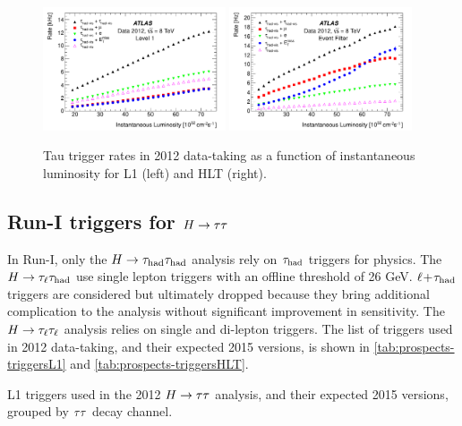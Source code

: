 \begin{figure}[tp]
  \centering
  \includegraphics[width=0.48\textwidth]{figures/PERF-2013-06/fig_01a}
  \includegraphics[width=0.48\textwidth]{figures/PERF-2013-06/fig_01b}
  \caption{Tau trigger rates in 2012 data-taking as a function of instantaneous luminosity for L1 (left) and HLT (right).}
  \label{fig:prospects-tautriggerrates}
\end{figure}

\subsection{Run-I triggers for $H\rightarrow\tau\tau$}

In Run-I, only the $H\rightarrow\tau_\text{had}\tau_\text{had}$ analysis rely on $\tau_\text{had}$ triggers for physics. The $H\rightarrow\tau_\ell\tau_\text{had}$ use single lepton triggers with an offline threshold of 26 GeV. $\ell\!+\!\tau_\text{had}$ triggers are considered but ultimately dropped because they bring additional complication to the analysis without significant improvement in sensitivity. The $H\rightarrow\tau_\ell\tau_\ell$ analysis relies on single and di-lepton triggers. The list of triggers used in 2012 data-taking, and their expected 2015 versions, is shown in \cref{tab:prospects-triggersL1} and \cref{tab:prospects-triggersHLT}.

\begin{table}[bp] 
  \centering
  \renewcommand{\arraystretch}{1.4}
  \caption{L1 triggers used in the 2012 $H\rightarrow\tau\tau$ analysis, and their expected 2015 versions, grouped by $\tau\tau$ decay channel.}
  
  \label{tab:prospects-triggersL1}
\end{table}


